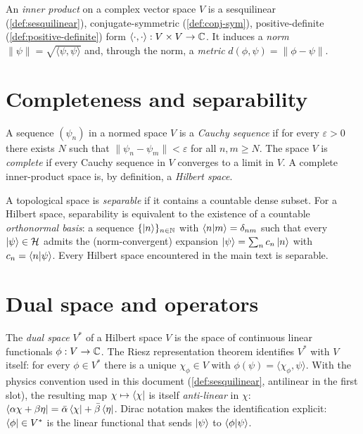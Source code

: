 \begin{definition}
\label{def:inner-product}
An \emph{inner product} on a complex vector space $V$ is a
sesquilinear (\cref{def:sesquilinear}), conjugate-symmetric
(\cref{def:conj-sym}), positive-definite
(\cref{def:positive-definite}) form
$\langle\cdot,\cdot\rangle:V\times V\to\mathbb{C}$. It induces a
\emph{norm} $\|\psi\|=\sqrt{\langle\psi,\psi\rangle}$ and, through
the norm, a \emph{metric} $d(\phi,\psi)=\|\phi-\psi\|$.
\end{definition}

\section{Completeness and separability}
\label{app:completeness}

\begin{definition}
\label{def:cauchy}
A sequence $(\psi_n)$ in a normed space $V$ is a \emph{Cauchy
sequence} if for every $\varepsilon>0$ there exists $N$ such that
$\|\psi_n-\psi_m\|<\varepsilon$ for all $n,m\geq N$. The space $V$
is \emph{complete} if every Cauchy sequence in $V$ converges to a
limit in $V$. A complete inner-product space is, by definition, a
\emph{Hilbert space}.
\end{definition}

\begin{definition}
\label{def:separable}
A topological space is \emph{separable} if it contains a countable
dense subset. For a Hilbert space, separability is equivalent to
the existence of a countable \emph{orthonormal basis}: a sequence
$\{\ket{n}\}_{n\in\mathbb{N}}$ with $\braket{n}{m}=\delta_{nm}$ such that
every $\ket{\psi}\in\mathcal{H}$ admits the (norm-convergent) expansion
$\ket{\psi}=\sum_n c_n\ket{n}$ with $c_n=\braket{n}{\psi}$. Every
Hilbert space encountered in the main text is separable.
\end{definition}

\section{Dual space and operators}
\label{app:dual-space}

\begin{definition}
\label{def:dual-space}
The \emph{dual space} $V^*$ of a Hilbert space $V$ is the space of
continuous linear functionals $\phi:V\to\mathbb{C}$. The Riesz
representation theorem identifies $V^*$ with $V$ itself: for every
$\phi\in V^*$ there is a unique $\chi_\phi\in V$ with
$\phi(\psi)=\langle\chi_\phi,\psi\rangle$. With the physics
convention used in this document (\cref{def:sesquilinear},
antilinear in the first slot), the resulting map
$\chi\mapsto\bra{\chi}$ is itself \emph{anti-linear} in $\chi$:
$\bra{\alpha\chi+\beta\eta}=\bar\alpha\bra{\chi}+\bar\beta\bra{\eta}$.
Dirac notation makes the identification explicit:
$\bra{\phi}\in V^*$ is the linear functional that sends
$\ket{\psi}$ to $\braket{\phi}{\psi}$.
\end{definition}

